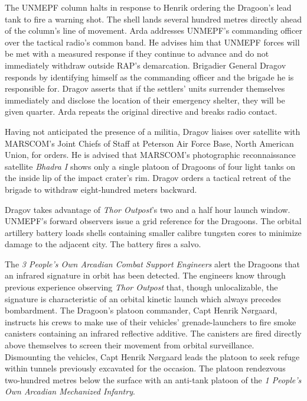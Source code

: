 The UNMEPF column halts in response to Henrik ordering the Dragoon's lead tank to fire a warning shot. The shell lands several hundred metres directly ahead of the column's line of movement. Arda addresses UNMEPF's commanding officer over the tactical radio's common band. He advises him that UNMEPF forces will be met with a measured response if they continue to advance and do not immediately withdraw outside RAP's demarcation. Brigadier General Dragov responds by identifying himself as the commanding officer and the brigade he is responsible for. Dragov asserts that if the settlers' units surrender themselves immediately and disclose the location of their emergency shelter, they will be given quarter. Arda repeats the original directive and breaks radio contact.

Having not anticipated the presence of a militia, Dragov liaises over satellite with MARSCOM's Joint Chiefs of Staff at Peterson Air Force Base, North American Union, for orders. He is advised that MARSCOM's photographic reconnaissance satellite {\it Bhadra I} shows only a single platoon of Dragoons of four light tanks on the inside lip of the impact crater's rim. Dragov orders a tactical retreat of the brigade to withdraw eight-hundred meters backward.
\StopTimelineDate

Dragov takes advantage of {\it Thor Outpost}'s two and a half hour launch window. UNMEPF's forward observers issue a grid reference for the Dragoons. The orbital artillery battery loads shells containing smaller calibre tungsten cores to minimize damage to the adjacent city. The battery fires a salvo.

The {\it 3 People's Own Arcadian Combat Support Engineers} alert the Dragoons that an infrared signature in orbit has been detected. The engineers know through previous experience observing {\it Thor Outpost} that, though unlocalizable, the signature is characteristic of an orbital kinetic launch which always precedes bombardment. The Dragoon's platoon commander, Capt Henrik Nørgaard, instructs his crews to make use of their vehicles' grenade-launchers to fire smoke canisters containing an infrared reflective additive. The canisters are fired directly above themselves to screen their movement from orbital surveillance. Dismounting the vehicles, Capt Henrik Nørgaard leads the platoon to seek refuge within tunnels previously excavated for the occasion. The platoon rendezvous two-hundred metres below the surface with an anti-tank platoon of the {\it 1 People's Own Arcadian Mechanized Infantry}.

